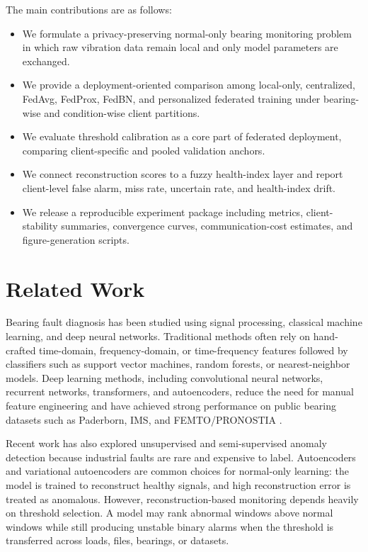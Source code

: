 \documentclass[11pt]{article}
\begin{document}
The main contributions are as follows:

\begin{itemize}
    \item We formulate a privacy-preserving normal-only bearing monitoring problem in which raw vibration data remain local and only model parameters are exchanged.
    \item We provide a deployment-oriented comparison among local-only, centralized, FedAvg, FedProx, FedBN, and personalized federated training under bearing-wise and condition-wise client partitions.
    \item We evaluate threshold calibration as a core part of federated deployment, comparing client-specific and pooled validation anchors.
    \item We connect reconstruction scores to a fuzzy health-index layer and report client-level false alarm, miss rate, uncertain rate, and health-index drift.
    \item We release a reproducible experiment package including metrics, client-stability summaries, convergence curves, communication-cost estimates, and figure-generation scripts.
\end{itemize}

\section{Related Work}

Bearing fault diagnosis has been studied using signal processing, classical machine learning, and deep neural networks. Traditional methods often rely on hand-crafted time-domain, frequency-domain, or time-frequency features followed by classifiers such as support vector machines, random forests, or nearest-neighbor models. Deep learning methods, including convolutional neural networks, recurrent networks, transformers, and autoencoders, reduce the need for manual feature engineering and have achieved strong performance on public bearing datasets such as Paderborn, IMS, and FEMTO/PRONOSTIA \citep{lessmeier2016paderborn,lee2007ims,nectoux2012pronostia}.

Recent work has also explored unsupervised and semi-supervised anomaly detection because industrial faults are rare and expensive to label. Autoencoders and variational autoencoders are common choices for normal-only learning: the model is trained to reconstruct healthy signals, and high reconstruction error is treated as anomalous. However, reconstruction-based monitoring depends heavily on threshold selection. A model may rank abnormal windows above normal windows while still producing unstable binary alarms when the threshold is transferred across loads, files, bearings, or datasets.
\end{document}
